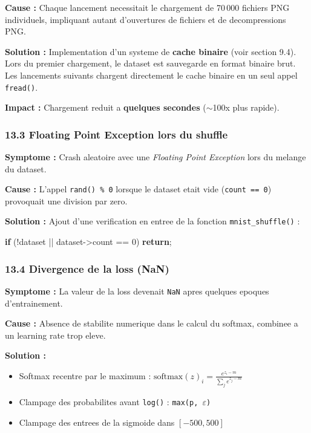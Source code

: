 \documentclass[
  letterpaper,
  DIV=11,
  numbers=noendperiod]{scrartcl}
\newenvironment{Shaded}{\begin{snugshade}}{\end{snugshade}}
\newcommand{\ControlFlowTok}[1]{\textcolor[rgb]{0.00,0.23,0.31}{\textbf{#1}}}
\newcommand{\DecValTok}[1]{\textcolor[rgb]{0.68,0.00,0.00}{#1}}
\newcommand{\NormalTok}[1]{\textcolor[rgb]{0.00,0.23,0.31}{#1}}
\newcommand{\OperatorTok}[1]{\textcolor[rgb]{0.37,0.37,0.37}{#1}}
\providecommand{\tightlist}{%
  \setlength{\itemsep}{0pt}\setlength{\parskip}{0pt}}
\begin{document}
\textbf{Cause :} Chaque lancement necessitait le chargement de 70\,000 fichiers PNG individuels, impliquant autant d'ouvertures de fichiers et de decompressions PNG.

\textbf{Solution :} Implementation d'un systeme de \textbf{cache binaire} (voir section 9.4). Lors du premier chargement, le dataset est sauvegarde en format binaire brut. Les lancements suivants chargent directement le cache binaire en un seul appel \texttt{fread()}.

\textbf{Impact :} Chargement reduit a \textbf{quelques secondes} ($\sim$100x plus rapide).

\subsubsection{13.3 Floating Point Exception lors du shuffle}\label{fpe-shuffle}

\textbf{Symptome :} Crash aleatoire avec une \emph{Floating Point Exception} lors du melange du dataset.

\textbf{Cause :} L'appel \texttt{rand() \% 0} lorsque le dataset etait vide (\texttt{count == 0}) provoquait une division par zero.

\textbf{Solution :} Ajout d'une verification en entree de la fonction \texttt{mnist\_shuffle()} :

\begin{Shaded}
\begin{Highlighting}[]
\ControlFlowTok{if} \OperatorTok{(!}\NormalTok{dataset }\OperatorTok{||}\NormalTok{ dataset}\OperatorTok{{-}\textgreater{}}\NormalTok{count }\OperatorTok{==} \DecValTok{0}\OperatorTok{)} \ControlFlowTok{return}\OperatorTok{;}
\end{Highlighting}
\end{Shaded}

\subsubsection{13.4 Divergence de la loss (NaN)}\label{loss-nan}

\textbf{Symptome :} La valeur de la loss devenait \texttt{NaN} apres quelques epoques d'entrainement.

\textbf{Cause :} Absence de stabilite numerique dans le calcul du softmax, combinee a un learning rate trop eleve.

\textbf{Solution :}
\begin{itemize}
\tightlist
\item Softmax recentre par le maximum : \(\text{softmax}(z)_i = \frac{e^{z_i - m}}{\sum_j e^{z_j - m}}\)
\item Clampage des probabilites avant \texttt{log()} : \texttt{max(p, $\varepsilon$)}
\item Clampage des entrees de la sigmoide dans \([-500, 500]\)
\end{itemize}
\end{document}
